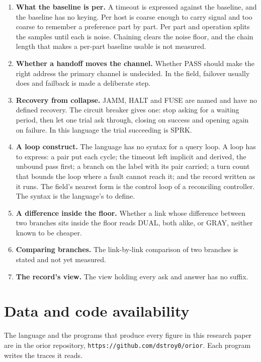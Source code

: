 \begin{enumerate}
\item \textbf{What the baseline is per.} A timeout is expressed against the baseline, and the
  baseline has no keying. Per host is coarse enough to carry signal and too coarse to remember a
  preference part by part. Per part and operation splits the samples until each is noise.
  Chaining clears the noise floor, and the chain length that makes a per-part baseline usable is
  not measured.
\item \textbf{Whether a handoff moves the channel.} Whether PASS should make the right address
  the primary channel is undecided. In the field, failover usually does and failback is made a
  deliberate step.
\item \textbf{Recovery from collapse.} JAMM, HALT and FUSE are named and have no defined
  recovery. The circuit breaker \cite{src:Nygard} gives one: stop asking for a waiting period,
  then let one trial ask through, closing on success and opening again on failure. In this
  language the trial succeeding is SPRK.
\item \textbf{A loop construct.} The language has no syntax for a query loop. A loop has to
  express: a pair put each cycle; the timeout left implicit and derived, the unbound pass first;
  a branch on the label with its pair carried; a turn count that bounds the loop where a fault
  cannot reach it; and the record written as it runs. The field's nearest form is the control
  loop of a reconciling controller. The syntax is the language's to define.
\item \textbf{A difference inside the floor.} Whether a link whose difference between two
  branches sits inside the floor reads DUAL, both alike, or GRAY, neither known to be cheaper.
\item \textbf{Comparing branches.} The link-by-link comparison of two branches is stated and not
  yet measured.
\item \textbf{The record's view.} The view holding every ask and answer has no suffix.
\end{enumerate}

\section{Data and code availability}

The language and the programs that produce every figure in this research paper are in the orior
repository, \texttt{https://github.com/dstroy0/orior}. Each program writes the traces it reads.
